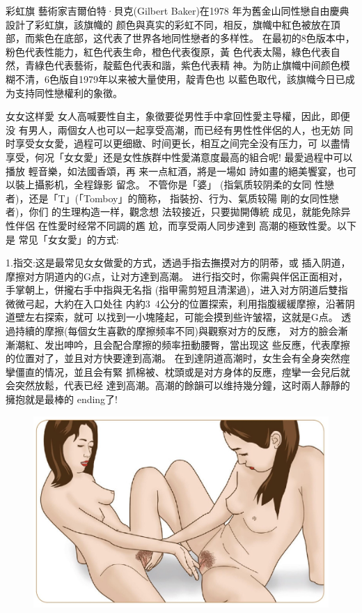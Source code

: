 \documentclass[12pt,UTF8]{ctexbook}
\begin{document}
彩虹旗
藝術家吉爾伯特·貝克(Gilbert Baker)在1978
年为舊金山同性戀自由慶典設計了彩虹旗，該旗幟的
颜色與真实的彩虹不同，相反，旗幟中紅色被放在頂
部，而紫色在底部，这代表了世界各地同性戀者的多样性。
在最初的8色版本中，粉色代表性能力，紅色代表生命，橙色代表復原，黃
色代表太陽，綠色代表自然，青綠色代表藝術，靛藍色代表和諧，紫色代表精
神。为防止旗幟中间颜色模糊不清，6色版自1979年以来被大量使用，靛青色也
以藍色取代，該旗幟今日已成为支持同性戀權利的象徵。

女女这样愛
女人高喊要性自主，象徵要從男性手中拿回性愛主导權，因此，即便没
有男人，兩個女人也可以一起享受高潮，而已经有男性性伴侶的人，也无妨
同时享受女女愛，過程可以更细緻、时间更长，相互之间完全没有压力，可
以盡情享受，何况「女女愛」还是女性族群中性愛滿意度最高的組合呢!
最愛過程中可以播放
輕音樂，如法國香頌，再
来一点紅酒，將是一場如
詩如畫的絕美饗宴，也可
以裝上攝影机，全程錄影
留念。
不管你是「婆」
(指氣质较阴柔的女同
性戀者)，还是「T」(「Tomboy」的簡称，
指裝扮、行为、氣质较陽
剛的女同性戀者)，你们
的生理构造一样，觀念想
法较接近，只要拋開傳統
成见，就能免除异性伴侶
在性愛时经常不同調的尷
尬，而享受兩人同步達到
高潮的極致性愛。以下是
常见「女女愛」的方式:

1.指交:这是最常见女女做愛的方式，透過手指去撫摸对方的阴蒂，或
插入阴道，摩擦对方阴道内的G点，让对方達到高潮。
进行指交时，你需與伴侶正面相对，手掌朝上，併攏右手中指與无名指
(指甲需剪短且清潔過)，进入对方阴道后雙指微微弓起，大約在入口处往
内約3~4公分的位置探索，利用指腹緩緩摩擦，沿著阴道壁左右探索，就可
以找到一小塊隆起，可能会摸到些许皱褶，这就是G点。
透過持續的摩擦(每個女生喜歡的摩擦频率不同)與觀察对方的反應，
对方的臉会漸漸潮紅、发出呻吟，且会配合摩擦的频率扭動腰臀，當出现这
些反應，代表摩擦的位置对了，並且对方快要達到高潮。
在到達阴道高潮时，女生会有全身突然痙攣僵直的情况，並且会有緊
抓棉被、枕頭或是对方身体的反應，痙攣一会兒后就会突然放鬆，代表已经
達到高潮。高潮的餘韻可以维持幾分鐘，这时兩人靜靜的擁抱就是最棒的
ending了!

\begin{figure}[htbp]
	\centering
	\includegraphics[width=0.7\linewidth]{10}
	\caption{}
	\label{fig:1}
\end{figure}
\end{document}
